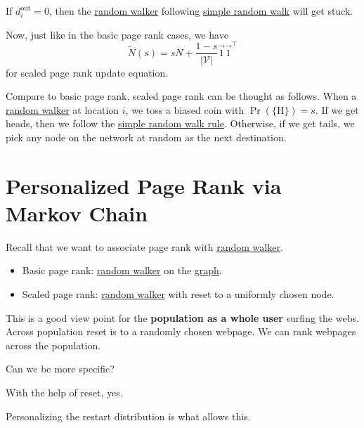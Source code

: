 \begin{note}
	If \(d_i^{\text{out}} = 0\), then the \hyperref[def:random-walker]{random walker} following \hyperref[def:simple-random-walk]{simple random walk} will get stuck.
\end{note}

Now, just like in the basic page rank cases, we have
\[
	\widetilde{N} (s) = s N + \frac{1-s}{\left\vert \mathcal{V}  \right\vert }\vec{1} \vec{1} ^{\top}
\]
for scaled page rank update equation.

\begin{intuition}
	Compare to basic page rank, scaled page rank can be thought as follows. When a \hyperref[def:random-walker]{random walker} at location \(i\), we toss a biased coin with \(\Pr(\{\mathrm{H} \}) = s\). If we get heads, then we follow the \hyperref[def:simple-random-walk]{simple random walk rule}. Otherwise, if we get tails, we pick any node on the network at random as the next destination.
\end{intuition}

\section{Personalized Page Rank via Markov Chain}
\begin{prev}
	Recall that we want to associate page rank with \hyperref[def:random-walker]{random walker}.
	\begin{itemize}
		\item Basic page rank: \hyperref[def:random-walker]{random walker} on the \hyperref[def:graph]{graph}.
		\item Scaled page rank: \hyperref[def:random-walker]{random walker} with reset to a uniformly chosen node.
	\end{itemize}
\end{prev}
This is a good view point for the \textbf{population as a whole user} surfing the webs. Across population reset is to a randomly chosen webpage. We can rank webpages across the population.

\begin{problem}
Can we be more specific?
\end{problem}
\begin{answer}
	With the help of reset, yes.
	\begin{remark}
		Personalizing the restart distribution is what allows this.
	\end{remark}
\end{answer}

